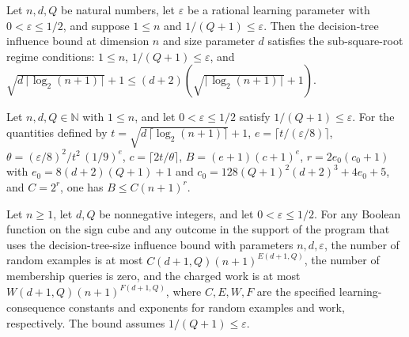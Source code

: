 \begin{theorem}
\label{FABL.decisionTreeSizeInfluenceBound_subsqrtRegime}
\leanok
{}
Let $n,d,Q$ be natural numbers, let $\varepsilon$ be a rational learning parameter with $0<\varepsilon\le
1/2$, and suppose $1\le n$ and $1/(Q+1)\le\varepsilon$. Then the decision-tree influence bound at
dimension $n$ and size parameter $d$ satisfies the sub-square-root regime conditions:
$1\le n$, $1/(Q+1)\le\varepsilon$, and
$\sqrt{d\,\lceil\log_2(n+1)\rceil}+1\le(d+2)(\sqrt{\lceil\log_2(n+1)\rceil}+1)$.
\end{theorem}

\begin{theorem}
\label{FABL.decisionTreeSizeFamilyBound_le_fixed_power}
\leanok
{}
Let $n,d,Q\in\mathbb{N}$ with $1\leq n$, and let $0<\varepsilon\leq 1/2$ satisfy
$1/(Q+1)\leq\varepsilon$. For the quantities defined by
$t=\sqrt{d\,\lceil\log_2(n+1)\rceil}+1$, $e=\lceil t/(\varepsilon/8)\rceil$,
$\theta=(\varepsilon/8)^2/t^2\,(1/9)^e$, $c=\lceil 2t/\theta\rceil$, $B=(e+1)(c+1)^e$,
$r=2e_0(c_0+1)$ with $e_0=8(d+2)(Q+1)+1$ and $c_0=128(Q+1)^2(d+2)^3+4e_0+5$, and
$C=2^r$, one has $B\leq C(n+1)^r$.
\end{theorem}

\begin{theorem}
\label{FABL.monotoneDecisionTreeSizeRandomExampleProgram_cost_le_fixed_power}
\leanok
{}
Let $n\ge 1$, let $d,Q$ be nonnegative integers, and let $0<\varepsilon\le 1/2$. For any
Boolean function on the sign cube and any outcome in the support of the program that
uses the decision-tree-size influence bound with parameters $n,d,\varepsilon$, the
number of random examples is at most $C(d+1,Q)(n+1)^{E(d+1,Q)}$, the number of
membership queries is zero, and the charged work is at most $W(d+1,Q)(n+1)^{F(d+1,Q)}$,
where $C,E,W,F$ are the specified learning-consequence constants and exponents for
random examples and work, respectively. The bound assumes $1/(Q+1)\le\varepsilon$.
\end{theorem}
